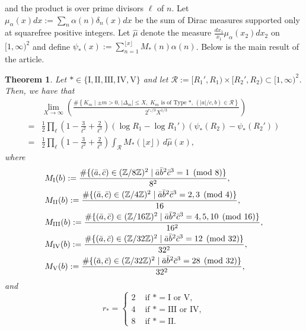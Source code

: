 \documentclass[table]{amsart}
\newtheorem{theorem}{Theorem}[section]
\newcommand{\Z}{\mathbb{Z}}
\numberwithin{equation}{section}
\begin{document}
\noindent and the product is over prime divisors $\ell$ of $n$. Let $\mu_\alpha(x) dx:=\sum_{n} \alpha(n)\delta_n(x)dx$ be the sum of Dirac measures supported only at squarefree positive integers. Let $\hat{\mu}$ denote the measure $\frac{dx_1}{x_1} \mu_\alpha(x_2)dx_2$ on $[1, \infty)^2$ and define $\psi_{\ast}(x):=\sum_{n=1}^{\lfloor x \rfloor} M_{\ast}(n) \alpha(n)$. Below is the main result of the article. \begin{theorem}\label{Main theorem}
Let $* \in \{\mathrm{I},\mathrm{II}, \mathrm{III}, \mathrm{IV}, \mathrm{V}\}$ and let $\mathcal{R}:=[R_1', R_1)\times [R_2', R_2)
\subset [1, \infty)^2$. Then, we have that
\[
\begin{split}& \lim_{X \to \infty}
\left(
\frac{
\#\left\{ K_m \mid \pm m>0,\, |\Delta_m| \leq X,\; K_m \text{ is of Type } \ast,\, (|a|/c,b) \in \mathcal{R} \right\}
}{
2^{r_*/3} X^{1/3}
}
\right)\\
= &
\frac{1}{2} \prod_\ell\left(1-\frac{3}{\ell^2}+\frac{2}{\ell^3}\right)(\log R_1 - \log R_1') \left( \psi_{*}(R_2) - \psi_{*}(R_2') \right) \\
= &
\frac{1}{2} \prod_\ell\left(1-\frac{3}{\ell^2}+\frac{2}{\ell^3}\right)\int_{\mathcal{R}} M_{*}(\lfloor x \rfloor) \, d\hat{\mu}(x),
\end{split}
\]
where
\[\begin{split}
& M_{\rm{I}}(b):=\frac{\# \{(\bar{a}, \bar{c})\in (\Z/8\Z)^2\mid \bar{a}\bar{b}^2\bar{c}^3=1\pmod{8}\}}{8^2}, \\
& M_{\rm{II}}(b):= \frac{\# \{(\bar{a}, \bar{c})\in (\Z/4\Z)^2\mid \bar{a}\bar{b}^2\bar{c}^3=2,3\pmod{4}\}}{16}, \\
& M_{\rm{III}}(b):=\frac{\# \{(\bar{a}, \bar{c})\in (\Z/16\Z)^2\mid \bar{a}\bar{b}^2\bar{c}^3=4, 5, 10\pmod{16}\}}{16^2}, \\
& M_{\rm{IV}}(b):=\frac{\# \{(\bar{a}, \bar{c})\in (\Z/32\Z)^2\mid \bar{a}\bar{b}^2\bar{c}^3=12\pmod{32}\}}{32^2}, \\
& M_{\rm{V}}(b):=\frac{\# \{(\bar{a}, \bar{c})\in (\Z/32\Z)^2\mid \bar{a}\bar{b}^2\bar{c}^3=28\pmod{32}\}}{32^2},
\end{split}\]
and
\[r_\ast=\begin{cases}
    2 & \text{ if }\ast = \mathrm{I}\text{ or }\mathrm{V},\\
    4& \text{ if }\ast = \mathrm{III}\text{ or }\mathrm{IV},\\
    8 & \text{ if }\ast=\mathrm{II}.
\end{cases}\]

\end{theorem}
\end{document}

